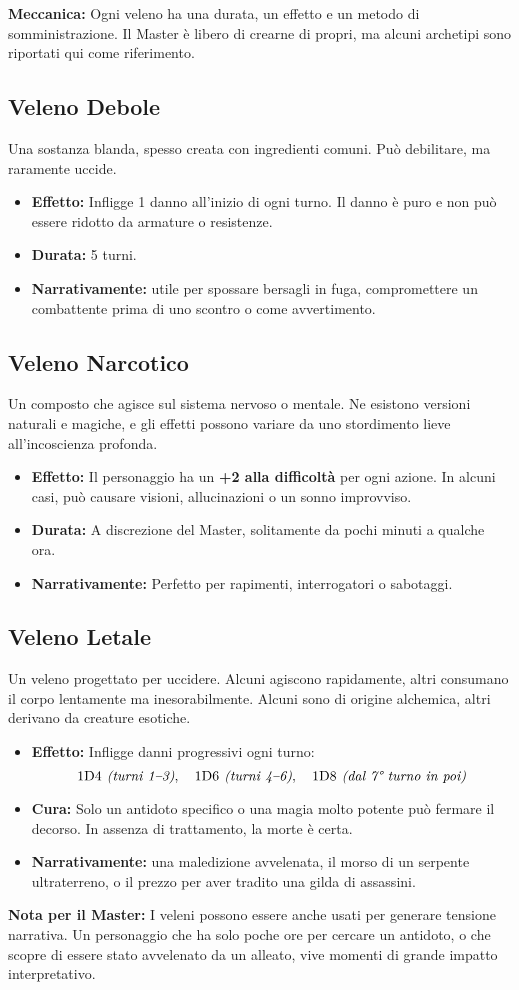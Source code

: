 \documentclass[../manuale_main.tex]{subfiles}
\begin{document}
\textbf{Meccanica:} Ogni veleno ha una durata, un effetto e un metodo di somministrazione. Il Master è libero di crearne di propri, ma alcuni archetipi sono riportati qui come riferimento.

\subsection{Veleno Debole}
Una sostanza blanda, spesso creata con ingredienti comuni. Può debilitare, ma raramente uccide.

\begin{itemize}
\item \textbf{Effetto:} Infligge 1 danno all’inizio di ogni turno. Il danno è puro e non può essere ridotto da armature o resistenze.
\item \textbf{Durata:} 5 turni.
\item \textbf{Narrativamente:} utile per spossare bersagli in fuga, compromettere un combattente prima di uno scontro o come avvertimento.
\end{itemize}

\subsection{Veleno Narcotico}
Un composto che agisce sul sistema nervoso o mentale. Ne esistono versioni naturali e magiche, e gli effetti possono variare da uno stordimento lieve all’incoscienza profonda.

\begin{itemize}
\item \textbf{Effetto:} Il personaggio ha un \textbf{+2 alla difficoltà} per ogni azione. In alcuni casi, può causare visioni, allucinazioni o un sonno improvviso.
\item \textbf{Durata:} A discrezione del Master, solitamente da pochi minuti a qualche ora.
\item \textbf{Narrativamente:} Perfetto per rapimenti, interrogatori o sabotaggi.
\end{itemize}

\subsection{Veleno Letale}
Un veleno progettato per uccidere. Alcuni agiscono rapidamente, altri consumano il corpo lentamente ma inesorabilmente. Alcuni sono di origine alchemica, altri derivano da creature esotiche.

\begin{itemize}
\item \textbf{Effetto:} Infligge danni progressivi ogni turno: 
\[
\textnormal{1D4} \textit{ (turni 1–3)}, \quad \textnormal{1D6} \textit{ (turni 4–6)}, \quad \textnormal{1D8} \textit{ (dal 7° turno in poi)}
\]
\item \textbf{Cura:} Solo un antidoto specifico o una magia molto potente può fermare il decorso. In assenza di trattamento, la morte è certa.
\item \textbf{Narrativamente:} una maledizione avvelenata, il morso di un serpente ultraterreno, o il prezzo per aver tradito una gilda di assassini.
\end{itemize}

\textbf{Nota per il Master:} I veleni possono essere anche usati per generare tensione narrativa. Un personaggio che ha solo poche ore per cercare un antidoto, o che scopre di essere stato avvelenato da un alleato, vive momenti di grande impatto interpretativo.
\end{document}
